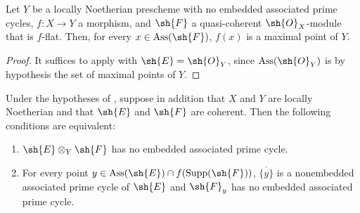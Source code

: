 \begin{corollary}[3.3.2]
\label{IV.3.3.2}
Let $Y$ be a locally Noetherian prescheme with no embedded associated prime cycles, $f:X\to Y$ a morphism, and $\sh{F}$ a quasi-coherent $\sh{O}_X$-module that is $f$-flat.
Then, for every $x\in\operatorname{Ass}(\sh{F})$, $f(x)$ is a maximal point of $Y$.
\end{corollary}

\begin{proof}
It suffices to apply  with $\sh{E}=\sh{O}_Y$, since $\operatorname{Ass}(\sh{O}_Y)$ is by hypothesis the set of maximal points of $Y$.
\end{proof}

\begin{corollary}[3.3.3]
\label{IV.3.3.3}
Under the hypotheses of , suppose in addition that $X$ and $Y$ are locally Noetherian and that $\sh{E}$ and $\sh{F}$ are coherent.
Then the following conditions are equivalent:
\begin{enumerate}
  \item[\emph{a)}] $\sh{E}\otimes_Y\sh{F}$ has no embedded associated prime cycle.
  \item[\emph{b)}] For every point $y\in\operatorname{Ass}(\sh{E})\cap f(\operatorname{Supp}(\sh{F}))$, $\overline{\{y\}}$ is a nonembedded associated prime cycle of $\sh{E}$ and $\sh{F}_y$ has no embedded associated prime cycle.
\end{enumerate}
\end{corollary}


